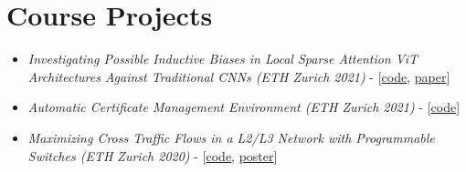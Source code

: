 \section{Course Projects}

\begin{itemize}

\item \textit{Investigating Possible Inductive Biases in Local Sparse Attention ViT Architectures Against Traditional CNNs (ETH Zurich 2021)} - [\href{https://github.com/Siddhant-Ray/Deep-Learning-Project-2021}{code}, \href{https://github.com/Siddhant-Ray/Inductive-Biases-in-CNNs-vs-Transformers/blob/main/ProjectReport.pdf}{paper}]
\item \textit{ Automatic Certificate Management Environment (ETH Zurich 2021)} - [\href{https://github.com/Siddhant-Ray/NetworkSecurity-ACME-Project}{code}]
\item  \textit{Maximizing Cross Traffic Flows in a L2/L3 Network with Programmable Switches (ETH Zurich 2020)} - [\href{https://github.com/Siddhant-Ray/Advnet-Project-ETH}{code}, \href{https://github.com/Siddhant-Ray/Cross-Traffic-Flow-Maximization-in-L2L3-Networks/blob/master/von-neumann.pdf}{poster}]
\end{itemize}